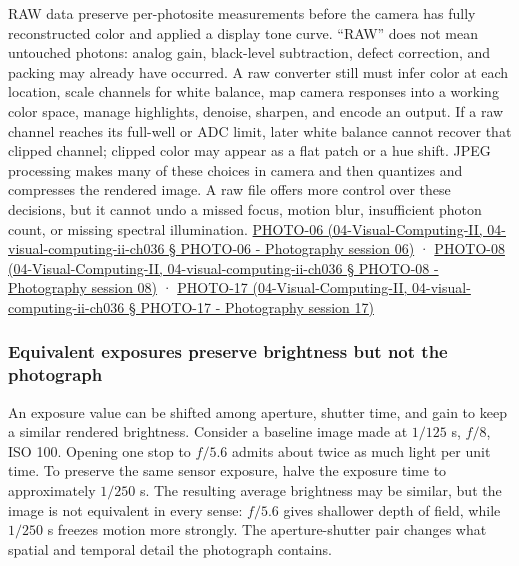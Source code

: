 RAW data preserve per-photosite measurements before the camera has fully reconstructed color and applied a display tone curve. ``RAW'' does not mean untouched photons: analog gain, black-level subtraction, defect correction, and packing may already have occurred. A raw converter still must infer color at each location, scale channels for white balance, map camera responses into a working color space, manage highlights, denoise, sharpen, and encode an output. If a raw channel reaches its full-well or ADC limit, later white balance cannot recover that clipped channel; clipped color may appear as a flat patch or a hue shift. JPEG processing makes many of these choices in camera and then quantizes and compresses the rendered image. A raw file offers more control over these decisions, but it cannot undo a missed focus, motion blur, insufficient photon count, or missing spectral illumination. \href{}{PHOTO-06 (04-Visual-Computing-II, 04-visual-computing-ii-ch036 § PHOTO-06 - Photography session 06)} · \href{}{PHOTO-08 (04-Visual-Computing-II, 04-visual-computing-ii-ch036 § PHOTO-08 - Photography session 08)} · \href{}{PHOTO-17 (04-Visual-Computing-II, 04-visual-computing-ii-ch036 § PHOTO-17 - Photography session 17)}

\subsubsection{Equivalent exposures preserve brightness but not the photograph}\label{equivalent-exposures-preserve-brightness-but-not-the-photograph}

An exposure value can be shifted among aperture, shutter time, and gain to keep a similar rendered brightness. Consider a baseline image made at \(1/125\) s, \(f/8\), ISO 100. Opening one stop to \(f/5.6\) admits about twice as much light per unit time. To preserve the same sensor exposure, halve the exposure time to approximately \(1/250\) s. The resulting average brightness may be similar, but the image is not equivalent in every sense: \(f/5.6\) gives shallower depth of field, while \(1/250\) s freezes motion more strongly. The aperture-shutter pair changes what spatial and temporal detail the photograph contains.

